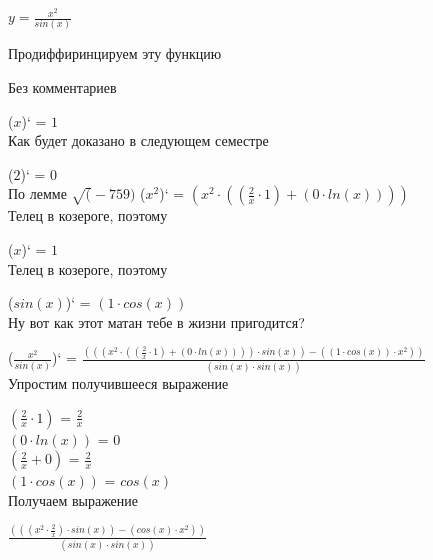 \documentclass[12pt,a4paper,fleqn]{article}
\begin{document}
$y = $$\frac{x^{2}}{sin(x)}$

 Продиффиринцируем эту функцию

Без комментариев

($x$)` = $1$\\
Как будет доказано в следующем семестре

($2$)` = $0$\\
По лемме $\sqrt(-759)$
($x^{2}$)` = $(x^{2} \cdot ((\frac{2}{x} \cdot 1) + (0 \cdot ln(x))))$\\
Телец в козероге, поэтому

($x$)` = $1$\\
Телец в козероге, поэтому

($sin(x)$)` = $(1 \cdot cos(x))$\\
Ну вот как этот матан тебе в жизни пригодится?

($\frac{x^{2}}{sin(x)}$)` = $\frac{(((x^{2} \cdot ((\frac{2}{x} \cdot 1) + (0 \cdot ln(x)))) \cdot sin(x)) - ((1 \cdot cos(x)) \cdot x^{2}))}{(sin(x) \cdot sin(x))}$\\


Упростим получившееся выражение

$(\frac{2}{x} \cdot 1)$ = $\frac{2}{x}$\\
$(0 \cdot ln(x))$ = $0$\\
$(\frac{2}{x} + 0)$ = $\frac{2}{x}$\\
$(1 \cdot cos(x))$ = $cos(x)$\\


 Получаем выражение

$\frac{(((x^{2} \cdot \frac{2}{x}) \cdot sin(x)) - (cos(x) \cdot x^{2}))}{(sin(x) \cdot sin(x))}$
\end{document}

